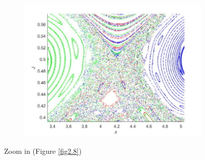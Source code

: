 \begin{figure}[H]
\begin{subfigure}{.32\textwidth}
		\centering
		\includegraphics[scale=0.25]{Hamiltonian_1/numerical/figs/Q5_1e-2.1e-2_3634_zoom3}
		\caption{}
		\label{fig2.9c}
	\end{subfigure}
	\label{fig2.9}
	\caption{Zoom in (Figure \ref{fig2.8})}
\end{figure}
%

